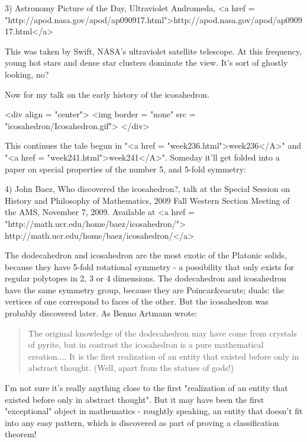 3) Astronomy Picture of the Day, Ultraviolet Andromeda, 
<a href = "http://apod.nasa.gov/apod/ap090917.html">http://apod.nasa.gov/apod/ap090917.html</a>

This was taken by Swift, NASA's ultraviolet satellite telescope.
At this frequency, young hot stars and dense star clusters dominate 
the view.  It's sort of ghostly looking, no?

Now for my talk on the early history of the icosahedron. 

<div align = "center">
<img border = "none" src = "icosahedron/Icosahedron.gif">
</div>

 This
continues the tale begun in "<a href =
"week236.html">week236</A>" and "<a href =
"week241.html">week241</A>".  Someday it'll get folded into a
paper on special properties of the number 5, and 5-fold symmetry:

4) John Baez, Who discovered the icosahedron?, talk at the Special 
Session on History and Philosophy of Mathematics, 2009 Fall Western 
Section Meeting of the AMS, November 7, 2009. 
Available at <a href = "http://math.ucr.edu/home/baez/icosahedron/">
http://math.ucr.edu/home/baez/icosahedron/</a>

The dodecahedron and icosahedron are the most exotic of the Platonic
solids, because they have 5-fold rotational symmetry - a possibility
that only exists for regular polytopes in 2, 3 or 4 dimensions.  The
dodecahedron and icosahedron have the same symmetry group, because 
they are Poincar&eacute; duals: the vertices of one correspond to faces of
the other.  But the icosahedron was probably discovered later.  As 
Benno Artmann wrote:

\begin{quote}
  The original knowledge of the dodecahedron may have come from 
  crystals of pyrite, but in contrast the icosahedron is a pure 
  mathematical creation.... It is the first realization of an 
  entity that existed before only in abstract thought.  (Well,  
  apart from the statues of gods!)
\end{quote}

I'm not sure it's really anything close to the first "realization of 
an entity that existed before only in abstract thought".  But 
it may have been the first "exceptional" object in mathematics - 
roughtly speaking, an entity that doesn't fit into any easy pattern,
which is discovered as part of proving a classification theorem!   

